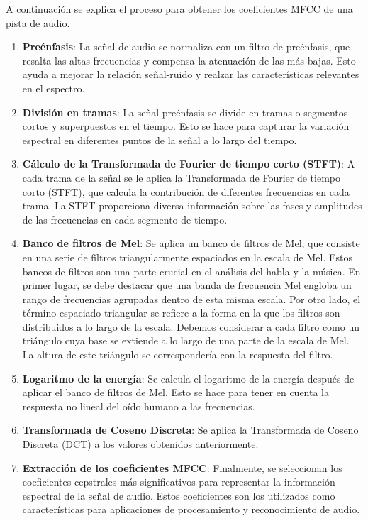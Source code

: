 A continuación se explica el proceso para obtener los coeficientes MFCC de una pista de audio.

\begin{enumerate}
\tightlist
\item \textbf{Preénfasis}: La señal de audio se normaliza con un filtro de preénfasis, que resalta las altas frecuencias y compensa la atenuación de las más bajas. Esto ayuda a mejorar la relación señal-ruido y realzar las características relevantes en el espectro.

\item \textbf{División en tramas}: La señal preénfasis se divide en tramas o segmentos cortos y superpuestos en el tiempo. Esto se hace para capturar la variación espectral en diferentes puntos de la señal a lo largo del tiempo.

\item \textbf{Cálculo de la Transformada de Fourier de tiempo corto (STFT)}: A cada trama de la señal se le aplica la Transformada de Fourier de tiempo corto (STFT), que calcula la contribución de diferentes frecuencias en cada trama. La STFT proporciona diversa información sobre las fases y amplitudes de las frecuencias en cada segmento de tiempo.

\item \textbf{Banco de filtros de Mel}: Se aplica un banco de filtros de Mel, que consiste en una serie de filtros triangularmente espaciados en la escala de Mel. Estos bancos de filtros son una parte crucial en el análisis del habla y la música.
En primer lugar, se debe destacar que una banda de frecuencia Mel engloba un rango de frecuencias agrupadas dentro de esta misma escala. Por otro lado, el término espaciado triangular se refiere a la forma en la que los filtros son distribuidos a lo largo de la escala. Debemos considerar a cada filtro como un triángulo cuya base se extiende a lo largo de una parte de la escala de Mel. La altura de este triángulo se correspondería con la respuesta del filtro.

\item \textbf{Logaritmo de la energía}: Se calcula el logaritmo de la energía después de aplicar el banco de filtros de Mel. Esto se hace para tener en cuenta la respuesta no lineal del oído humano a las frecuencias.

\item \textbf{Transformada de Coseno Discreta}: Se aplica la Transformada de Coseno Discreta (DCT) a los valores obtenidos anteriormente.

\item \textbf{Extracción de los coeficientes MFCC}: Finalmente, se seleccionan los coeficientes cepstrales más significativos para representar la información espectral de la señal de audio. Estos coeficientes son los utilizados como características para aplicaciones de procesamiento y reconocimiento de audio.
\end{enumerate}

